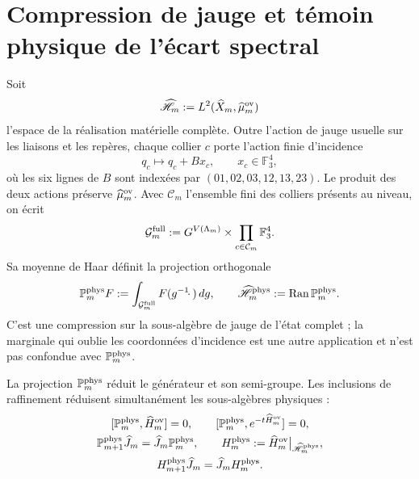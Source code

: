 \section*{Compression de jauge et témoin physique de l'écart spectral}

Soit
\[
 \widehat{\mathscr H}_m
 :=L^2(\widehat X_m,\widehat\mu_m^{\rm ov})
\]
l'espace de la réalisation matérielle complète. Outre l'action de jauge usuelle sur les liaisons et les repères, chaque collier \(c\) porte l'action finie d'incidence
\begin{equation}\label{eq:amp-ym-accion-gauge-incidencia}
 q_c\longmapsto q_c+Bx_c,
 \qquad x_c\in\mathbb F_3^4,
\end{equation}
où les six lignes de \(B\) sont indexées par
\((01,02,03,12,13,23)\). Le produit des deux actions préserve
\(\widehat\mu_m^{\rm ov}\). Avec \(\mathcal C_m\) l’ensemble fini des
colliers présents au niveau, on écrit
\[
 \mathcal G_m^{\rm full}
 :=G^{V(\Lambda_m)}
   \times\prod_{c\in\mathcal C_m}\mathbb F_3^4.
\]
Sa moyenne de Haar définit la projection
orthogonale
\begin{equation}\label{eq:amp-ym-proyeccion-fisica-haar}
 \mathbb P_m^{\rm phys}F
 :=\int_{\mathcal G_m^{\rm full}}F(g^{-1}\!\cdot\,)\,dg,
 \qquad
 \widehat{\mathscr H}_m^{\rm phys}
 :=\operatorname{Ran}\mathbb P_m^{\rm phys}.
\end{equation}
C'est une compression sur la sous-algèbre de jauge de l'état complet ; la marginale qui oublie les coordonnées d'incidence est une autre application et n'est pas confondue avec \(\mathbb P_m^{\rm phys}\).

\begin{lemma}
\label{lem:amp-ym-compresion-fisica}
La projection \(\mathbb P_m^{\rm phys}\) réduit le générateur et son
semi-groupe. Les inclusions de raffinement réduisent simultanément les
sous-algèbres physiques :
\begin{equation}\label{eq:amp-ym-compresion-entrelazada}
 \begin{gathered}
 [\mathbb P_m^{\rm phys},\widehat H_m^{\rm ov}]=0,
 \qquad
 [\mathbb P_m^{\rm phys},e^{-t\widehat H_m^{\rm ov}}]=0,\\
 \mathbb P_{m+1}^{\rm phys}\widehat J_m
 =\widehat J_m\mathbb P_m^{\rm phys},\qquad
 H_m^{\rm phys}
 :=\widehat H_m^{\rm ov}\big|_{\widehat{\mathscr H}_m^{\rm phys}},\\
 H_{m+1}^{\rm phys}\widehat J_m
 =\widehat J_mH_m^{\rm phys}.
 \end{gathered}
\end{equation}
\end{lemma}

